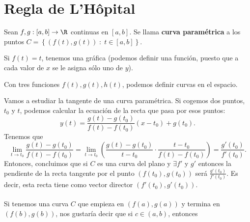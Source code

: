 \section{Regla de L'Hôpital}
\begin{fdefinition}
	\normalfont Sean $\displaystyle f,g : \left[a,b\right]  \to \R $ continuas en $\displaystyle \left[a,b\right]  $. Se llama \textbf{curva paramétrica} a los puntos $\displaystyle C = \left\{ \left(f\left(t\right), g\left(t\right)\right) \; : \; t \in \left[a,b\right] \right\}  $.
\end{fdefinition}
\begin{observation}
\normalfont Si $\displaystyle f\left(t\right) = t $, tenemos una gráfica (podemos definir una función, puesto que a cada valor de $\displaystyle x $ se le asigna sólo uno de $\displaystyle y $).
\end{observation}
\begin{observation}
\normalfont Con tres funciones $\displaystyle f\left(t\right),g\left(t\right),h\left(t\right) $, podemos definir curvas en el espacio.
\end{observation}
Vamos a estudiar la tangente de una curva paramétrica. Si cogemos dos puntos, $\displaystyle t_{0} $ y $\displaystyle t $, podemos calcular la ecuación de la recta que pasa por esos puntos:
\[y\left(t\right) =  \frac{g\left(t\right)-g\left(t_{0}\right)}{f\left(t\right)-f\left(t_{0}\right)}\left(x-t_{0}\right) + g\left(t_{0}\right)   .\]
Tenemos que 
\[\lim_{t \to t_{0}}\frac{g\left(t\right)-g\left(t_{0}\right)}{f\left(t\right)-f\left(t_{0}\right)}= \lim_{t \to t_{0}} \left(\frac{g\left(t\right)-g\left(t_{0}\right)}{t-t_{0}} \cdot \frac{t - t_{0}}{f\left(t\right)-f\left(t_{0}\right)}\right) = \frac{g'\left(t_{0}\right)}{f'\left(t_{0}\right)} .\]
Entonces, concluimos que si $\displaystyle C $ es una curva del plano y $\displaystyle \exists f' $ y $\displaystyle g' $ entonces la pendiente de la recta tangente por el punto $\displaystyle \left(f\left(t_{0}\right), g\left(t_{0}\right)\right) $ será $\displaystyle \frac{g'\left(t_{0}\right)}{f'\left(t_{0}\right)} $. Es decir, esta recta tiene como vector director $\displaystyle \left(f'\left(t_{0}\right), g'\left(t_{0}\right)\right) $. \\ \\ 
Si tenemos una curva $\displaystyle C $ que empieza en $\displaystyle \left(f\left(a\right), g\left(a\right)\right) $ y termina en $\displaystyle \left(f\left(b\right), g\left(b\right)\right) $, nos gustaría decir que si $\displaystyle c \in \left(a,b\right) $, entonces
